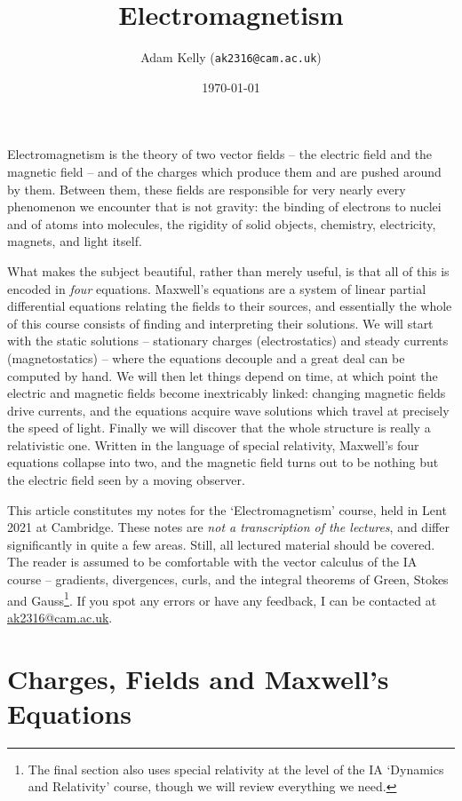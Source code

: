 \documentclass[a4paper]{scrartcl}
\title{Electromagnetism}
\author{Adam Kelly (\texttt{ak2316@cam.ac.uk})}
\date{\today}
\begin{document}
\maketitle

Electromagnetism is the theory of two vector fields -- the electric field and the magnetic field -- and of the charges which produce them and are pushed around by them. Between them, these fields are responsible for very nearly every phenomenon we encounter that is not gravity: the binding of electrons to nuclei and of atoms into molecules, the rigidity of solid objects, chemistry, electricity, magnets, and light itself.

What makes the subject beautiful, rather than merely useful, is that all of this is encoded in \emph{four} equations. Maxwell's equations are a system of linear partial differential equations relating the fields to their sources, and essentially the whole of this course consists of finding and interpreting their solutions. We will start with the static solutions -- stationary charges (electrostatics) and steady currents (magnetostatics) -- where the equations decouple and a great deal can be computed by hand. We will then let things depend on time, at which point the electric and magnetic fields become inextricably linked: changing magnetic fields drive currents, and the equations acquire wave solutions which travel at precisely the speed of light. Finally we will discover that the whole structure is really a relativistic one. Written in the language of special relativity, Maxwell's four equations collapse into two, and the magnetic field turns out to be nothing but the electric field seen by a moving observer.

This article constitutes my notes for the `Electromagnetism' course, held in Lent 2021 at Cambridge. These notes are \emph{not a transcription of the lectures}, and differ significantly in quite a few areas. Still, all lectured material should be covered. The reader is assumed to be comfortable with the vector calculus of the IA course -- gradients, divergences, curls, and the integral theorems of Green, Stokes and Gauss\footnote{The final section also uses special relativity at the level of the IA `Dynamics and Relativity' course, though we will review everything we need.}. If you spot any errors or have any feedback, I can be contacted at \href{mailto:ak2316@cam.ac.uk}{ak2316@cam.ac.uk}.

\tableofcontents

\section{Charges, Fields and Maxwell's Equations}
\end{document}
